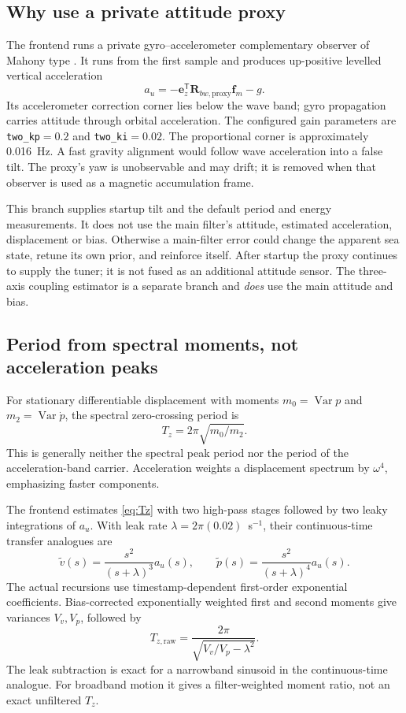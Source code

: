 \documentclass[conference]{IEEEtran}
\newcommand{\vc}[1]{\bm{#1}}
\newcommand{\mt}[1]{\bm{#1}}
\newcommand{\tr}{^{\mathsf T}}
\DeclareMathOperator{\Var}{Var}
\begin{document}
\subsection{Why use a private attitude proxy}
The frontend runs a private gyro--accelerometer complementary observer
of Mahony type \cite{mahony}. It runs from the first sample and produces
up-positive levelled vertical acceleration
\begin{equation}
 a_u=-\vc e_z\tr\mt R_{bw,\mathrm{proxy}}\vc f_m-g.
 \label{eq:verticalproxy}
\end{equation}
Its accelerometer correction corner lies below the wave band; gyro
propagation carries attitude through orbital acceleration. The configured
gain parameters are \texttt{two\_kp}$=0.2$ and
\texttt{two\_ki}$=0.02$. The proportional corner is approximately
0.016~Hz. A fast gravity alignment would follow wave acceleration into a
false tilt. The proxy's yaw is unobservable and may drift; it is removed
when that observer is used as a magnetic accumulation frame.

This branch supplies startup tilt and the default period and energy
measurements. It does not use the main filter's attitude, estimated
acceleration, displacement or bias. Otherwise a main-filter error could
change the apparent sea state, retune its own prior, and reinforce itself.
After startup the proxy continues to supply the tuner; it is not fused as
an additional attitude sensor. The three-axis coupling estimator is a
separate branch and \emph{does} use the main attitude and bias.

\subsection{Period from spectral moments, not acceleration peaks}
For stationary differentiable displacement with moments
$m_0=\Var p$ and $m_2=\Var\dot p$, the spectral zero-crossing period is
\begin{equation}
 T_z=2\pi\sqrt{m_0/m_2}.
 \label{eq:Tz}
\end{equation}
This is generally neither the spectral peak period nor the period of the
acceleration-band carrier. Acceleration weights a displacement spectrum
by $\omega^4$, emphasizing faster components.

The frontend estimates \cref{eq:Tz} with two high-pass stages followed
by two leaky integrations of $a_u$. With leak rate
$\lambda=2\pi(0.02)$~s$^{-1}$, their continuous-time transfer analogues are
\begin{equation}
 \tilde v(s)=\frac{s^2}{(s+\lambda)^3}a_u(s),\qquad
 \tilde p(s)=\frac{s^2}{(s+\lambda)^4}a_u(s).
 \label{eq:periodfilters}
\end{equation}
The actual recursions use timestamp-dependent first-order exponential
coefficients. Bias-corrected exponentially weighted first and second
moments give variances $V_v,V_p$, followed by
\begin{equation}
 T_{z,\mathrm{raw}}=\frac{2\pi}{\sqrt{V_v/V_p-\lambda^2}}.
 \label{eq:Traw}
\end{equation}
The leak subtraction is exact for a narrowband sinusoid in the
continuous-time analogue. For broadband motion it gives a filter-weighted
moment ratio, not an exact unfiltered $T_z$.
\end{document}

